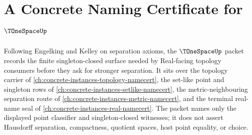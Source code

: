 \chapter{A Concrete Naming Certificate for $\TOneSpaceUp$}
\label{ch:concrete-instances-t1-space-namecert}

Following Engelking and Kelley on separation axioms, the $\TOneSpaceUp$ packet records the finite singleton-closed surface needed by Real-facing topology consumers before they ask for stronger separation. It sits over the topology carrier of \autoref{ch:concrete-instances-topology-namecert}, the set-like point and singleton rows of \autoref{ch:concrete-instances-setlike-namecert}, the metric-neighbouring separation route of \autoref{ch:concrete-instances-metric-namecert}, and the terminal real-name seal of \autoref{ch:concrete-instances-real-namecert}. The packet names only the displayed point classifier and singleton-closed witnesses; it does not assert Hausdorff separation, compactness, quotient spaces, host point equality, or choice.

